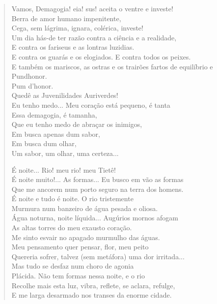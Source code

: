 \begin{verse}
Vamos, Demagogia! eia! sus! aceita o ventre e investe!\\
Berra de amor humano impenitente,\\
Cega, sem lágrima, ignara, colérica, investe!\\
Um dia hás-de ter razão contra a ciência e a realidade,\\
E contra os fariseus e as lontras luzidias.\\
E contra os guarás e os elogiados. E contra todos os peixes.\\
E também os mariscos, as ostras e os trairões fartos de equilíbrio e\\
Pundhonor.\\
\quad\quad\quad\quad{}Pum d'honor.\\
\hfill{}Quedê as Juvenilidades Auriverdes!\\
Eu tenho medo... Meu coração está pequeno, é tanta\\
Essa demagogia, é tamanha,\\
Que eu tenho medo de abraçar os inimigos,\\
Em busca apenas dum sabor,\\
Em busca dum olhar,\\
Um sabor, um olhar, uma certeza...

É noite... Rio! meu rio! meu Tietê!\\
É noite muito!... As formas... Eu busco em vão as formas\\
Que me ancorem num porto seguro na terra dos homens.\\
É noite e tudo é noite. O rio tristemente\\
Murmura num banzeiro de água pesada e oliosa.\\
Água noturna, noite líquida... Augúrios mornos afogam\\
As altas torres do meu exausto coração.\\
Me sinto esvair no apagado murmulho das águas.\\
Meu pensamento quer pensar, flor, meu peito\\
Quereria sofrer, talvez (sem metáfora) uma dor irritada...\\
Mas tudo se desfaz num choro de agonia\\
Plácida. Não tem formas nessa noite, e o rio\\
Recolhe mais esta luz, vibra, reflete, se aclara, refulge,\\
E me larga desarmado nos transes da enorme cidade.


\end{verse}
